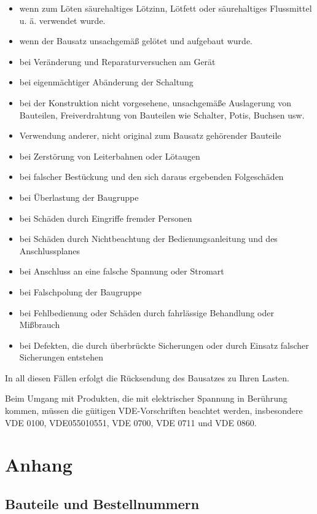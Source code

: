 \documentclass[fleqn,10pt]{SelfArx} %
\begin{document}
\begin{itemize}[noitemsep] %
\item wenn zum Löten säurehaltiges Lötzinn, Lötfett oder säurehaltiges Flussmittel u. ä. verwendet wurde.
\item wenn der Bausatz unsachgemäß gelötet und aufgebaut wurde.
\item bei Veränderung und Reparaturversuchen am Gerät
\item bei eigenmächtiger Abänderung der Schaltung
\item bei der Konstruktion nicht vorgesehene, unsachgemäße Auslagerung von Bauteilen, Freiverdrahtung von Bauteilen wie Schalter, Potis,
Buchsen usw.
\item Verwendung anderer, nicht original zum Bausatz gehörender Bauteile
\item bei Zerstörung von Leiterbahnen oder Lötaugen
\item bei falscher Bestückung und den sich daraus ergebenden Folgeschäden
\item bei Überlastung der Baugruppe
\item bei Schäden durch Eingriffe fremder Personen
\item bei Schäden durch Nichtbeachtung der Bedienungsanleitung und des Anschlussplanes
\item bei Anschluss an eine falsche Spannung oder Stromart
\item bei Falschpolung der Baugruppe
\item bei Fehlbedienung oder Schäden durch fahrlässige Behandlung oder Mißbrauch
\item bei Defekten, die durch überbrückte Sicherungen oder durch Einsatz falscher Sicherungen entstehen
\end{itemize}

In all diesen Fällen erfolgt die Rücksendung des Bausatzes zu Ihren Lasten.

Beim Umgang mit Produkten, die mit elektrischer Spannung in Berührung kommen, müssen die güitigen VDE-Vorschriften beachtet werden, insbesondere VDE 0100, VDE055010551, VDE 0700, VDE 0711
und VDE 0860.


\section{Anhang}

 \subsection*{Bauteile und Bestellnummern}
\end{document}
